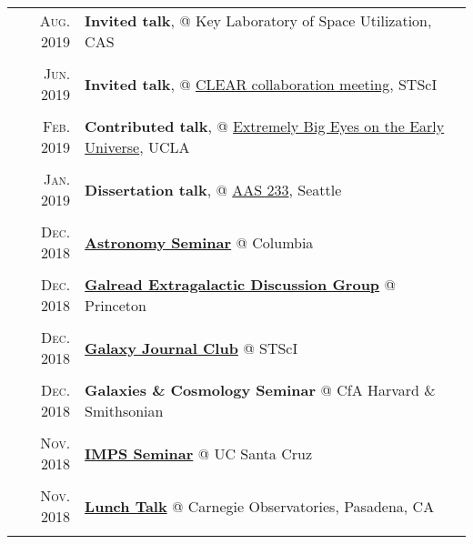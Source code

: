 \documentclass[letterpaper,10pt]{article}
\newcommand{\textwrap}{5.8in}       %
\begin{document}
\begin{longtable}{r|p{\textwrap}}
    \textsc{Aug. 2019}   &   \textbf{Invited talk}, @ Key Laboratory of Space Utilization, CAS \\
    \multicolumn{2}{c}{} \\

    \textsc{Jun. 2019}   &   \textbf{Invited talk}, @ \href{https://sites.google.com/view/clearhst19/home}{CLEAR collaboration meeting}, STScI \\
    \multicolumn{2}{c}{} \\

    \textsc{Feb. 2019}   &   \textbf{Contributed talk}, @ \href{https://conferences.pa.ucla.edu/early-universe-2019/agenda.html}{Extremely Big Eyes on the Early Universe}, UCLA  \\
    \multicolumn{2}{c}{} \\

    \textsc{Jan. 2019}   &   \textbf{Dissertation talk}, @ \href{https://aas.org/meetings/aas233}{AAS 233}, Seattle    \\
    \multicolumn{2}{c}{} \\

    \textsc{Dec. 2018}   &   \href{http://www.astro.columbia.edu/event?eid=584}{\textbf{Astronomy Seminar}} @ Columbia \\
    \multicolumn{2}{c}{} \\

    \textsc{Dec. 2018}   &   \href{https://web.astro.princeton.edu/node/9886}{\textbf{Galread Extragalactic Discussion Group}} @ Princeton \\
    \multicolumn{2}{c}{} \\

    \textsc{Dec. 2018}   &   \href{https://sites.google.com/site/stscigalaxyclub/}{\textbf{Galaxy Journal Club}} @ STScI \\
    \multicolumn{2}{c}{} \\

    \textsc{Dec. 2018}   &   \textbf{Galaxies \& Cosmology Seminar} @ CfA Harvard \& Smithsonian \\
    \multicolumn{2}{c}{} \\

    \textsc{Nov. 2018}   &   \href{https://docs.google.com/document/d/1fhFuTsbHO7ATeQEiBvRQ4fj_BDR7pM4HPMjxeMyEyh4/edit}{\textbf{IMPS Seminar}} @ UC Santa Cruz \\
    \multicolumn{2}{c}{} \\

    \textsc{Nov. 2018}   &   \href{https://obs.carnegiescience.edu/content/tbd-108}{\textbf{Lunch Talk}} @ Carnegie Observatories, Pasadena, CA \\
    \multicolumn{2}{c}{} \\


\end{longtable}
\end{document}
